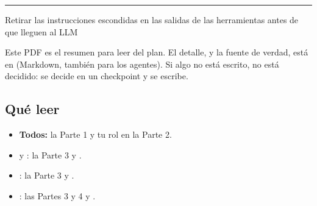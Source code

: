 \thispagestyle{empty}
{\color{ink}\rule{\linewidth}{4pt}}\par\vspace{18pt}
{\bfseries\fontsize{30}{34}\selectfont{} \Project\par}\vspace{10pt}
{\color{muted}\Large Retirar las instrucciones escondidas en las salidas de las herramientas antes de que lleguen al LLM}\par\vspace{6pt}
{\color{muted}\Hackathon}\par\vspace{24pt}

\begin{callout}
Este PDF es el resumen para leer del plan. El detalle, y la fuente de verdad, está en \Docs{} (Markdown, también para los agentes). Si algo no está escrito, no está decidido: se decide en un checkpoint y se escribe.
\end{callout}

\subsection*{Qué leer}
\begin{itemize}
  \item \textbf{Todos:} la Parte 1 y tu rol en la Parte 2.
  \item {} y : la Parte 3 y .
  \item {}: la Parte 3 y .
  \item {}: las Partes 3 y 4 y .
\end{itemize}

\clearpage
\renewcommand{\contentsname}{Contenido}
{\small\setlength{\parskip}{1pt}\linespread{1.0}\selectfont\tableofcontents}
